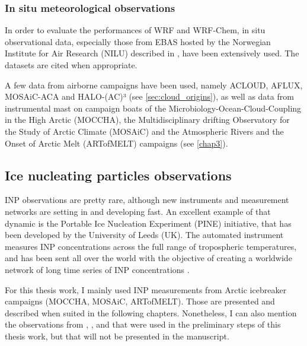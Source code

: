         \subsubsection{In situ meteorological observations}
        In order to evaluate the performances of WRF and WRF-Chem, in situ observational data, especially those from EBAS hosted by the Norwegian Institute for Air Research (NILU) described in \citet{torseth_introduction_2012}, have been extensively used. The datasets are cited when appropriate.

        A few data from airborne campaigns have been used, namely ACLOUD, AFLUX, MOSAiC-ACA and HALO-(AC)³ (see \cref{sec:cloud_origins}), as well as data from instrumental mast on campaign boats of the Microbiology-Ocean-Cloud-Coupling in the High Arctic (MOCCHA), the Multidisciplinary drifting Observatory for the Study of Arctic Climate (MOSAiC) and the Atmospheric Rivers and the Onset of Arctic Melt (ARTofMELT) campaigns (see \cref{chap3}). 


    \subsection{Ice nucleating particles observations}
    INP observations are pretty rare, although new instruments and measurement networks are setting in and developing fast. 
    An excellent example of that dynamic is the Portable Ice Nucleation Experiment (PINE) initiative, that has been developed by the University of Leeds (UK). The automated instrument measures INP concentrations across the full range of tropospheric temperatures, and has been sent all over the world with the objective of creating a worldwide network of long time series of INP concentrations \citep{mohler_portable_2021}.

    For this thesis work, I mainly used INP measurements from Arctic icebreaker campaigns (MOCCHA, MOSAiC, ARTofMELT). Those are presented and described when suited in the following chapters. 
    Nonetheless, I can also mention the observations from \citet{wex_annual_2019}, \citet{irish_ice_2019}, \citet{schrod_long-term_2020} and \citet{hartmann_wintertime_2020} that were used in the preliminary steps of this thesis work, but that will not be presented in the manuscript. %
\vspace{\baselineskip}

